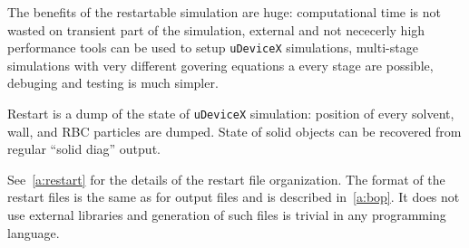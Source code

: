 The benefits of the restartable simulation are huge: computational
time is not wasted on transient part of the simulation, external and
not nececerly high performance tools can be used to
setup \texttt{uDeviceX} simulations, multi-stage simulations with very
different govering equations a every stage are possible, debuging and
testing is much simpler.

Restart is a dump of the state of \texttt{uDeviceX} simulation:
position of every solvent, wall, and RBC particles are dumped. State
of solid objects can be recovered from regular ``solid diag'' output.

See~\ref{a:restart} for the details of the restart file
organization. The format of the restart files is the same as for
output files and is described in~\ref{a:bop}. It does not use external
libraries and generation of such files is trivial in any programming
language.
